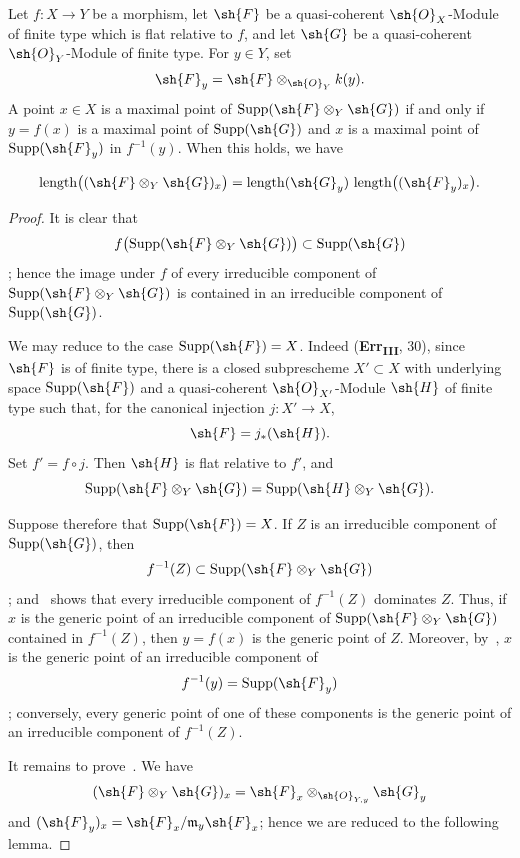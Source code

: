\begin{proposition}[2.5.5]
\label{IV.2.5.5}
Let $f:X\to Y$ be a morphism, let $\sh{F}$ be a quasi-coherent
$\sh{O}_X$-Module of finite type which is flat relative to $f$, and let
$\sh{G}$ be a quasi-coherent $\sh{O}_Y$-Module of finite type. For
$y\in Y$, set
\[
  \sh{F}_y=\sh{F}\otimes_{\sh{O}_Y}k(y).
\]
A point $x\in X$ is a maximal point of
$\operatorname{Supp}(\sh{F}\otimes_Y\sh{G})$ if and only if
$y=f(x)$ is a maximal point of $\operatorname{Supp}(\sh{G})$ and $x$
is a maximal point of $\operatorname{Supp}(\sh{F}_y)$ in $f^{-1}(y)$.
When this holds, we have
\end{proposition}

\begin{env}[2.5.5.1]
\label{IV.2.5.5.1}
\[
  \operatorname{length}\bigl((\sh{F}\otimes_Y\sh{G})_x\bigr)
  =
  \operatorname{length}(\sh{G}_y)\,
  \operatorname{length}\bigl((\sh{F}_y)_x\bigr).
\]
\end{env}

\begin{proof}
It is clear that
\[
  f\bigl(\operatorname{Supp}(\sh{F}\otimes_Y\sh{G})\bigr)
  \subset \operatorname{Supp}(\sh{G})
\]
; hence the image under $f$ of every irreducible
component of $\operatorname{Supp}(\sh{F}\otimes_Y\sh{G})$ is contained
in an irreducible component of $\operatorname{Supp}(\sh{G})$.

  We may reduce to the case $\operatorname{Supp}(\sh{F})=X$. Indeed
  \textnormal{(}\textbf{Err}\textsubscript{\textbf{III}}, 30\textnormal{)},
  since $\sh{F}$ is of finite type, there is a closed subprescheme
  $X'\subset X$ with underlying space $\operatorname{Supp}(\sh{F})$ and a
  quasi-coherent $\sh{O}_{X'}$-Module $\sh{H}$ of finite type such that,
  for the canonical injection $j:X'\to X$,
  \[
    \sh{F}=j_*(\sh{H}).
  \]
  Set $f'=f\circ j$. Then $\sh{H}$ is flat relative to $f'$, and
  \[
    \operatorname{Supp}(\sh{F}\otimes_Y\sh{G})
    =
    \operatorname{Supp}(\sh{H}\otimes_Y\sh{G}).
  \]

  Suppose therefore that $\operatorname{Supp}(\sh{F})=X$. If $Z$ is an
  irreducible component of $\operatorname{Supp}(\sh{G})$, then
  \[
    f^{-1}(Z)\subset
    \operatorname{Supp}(\sh{F}\otimes_Y\sh{G})
  \]
  ; and~ shows that every irreducible
  component of $f^{-1}(Z)$ dominates $Z$. Thus, if $x$ is the generic
  point of an irreducible component of
  $\operatorname{Supp}(\sh{F}\otimes_Y\sh{G})$ contained in $f^{-1}(Z)$,
  then $y=f(x)$ is the generic point of $Z$. Moreover,
  by~, $x$ is the generic point of an irreducible
  component of
  \[
    f^{-1}(y)=\operatorname{Supp}(\sh{F}_y)
  \]
  ; conversely, every generic point of one of these
  components is the generic point of an irreducible component of
  $f^{-1}(Z)$.


It remains to prove~. We have
\[
  (\sh{F}\otimes_Y\sh{G})_x
  =
  \sh{F}_x\otimes_{\sh{O}_{Y,y}}\sh{G}_y
\]
 and
$(\sh{F}_y)_x=\sh{F}_x/\mathfrak{m}_y\sh{F}_x$; hence we are reduced to
the following lemma.
\end{proof}

